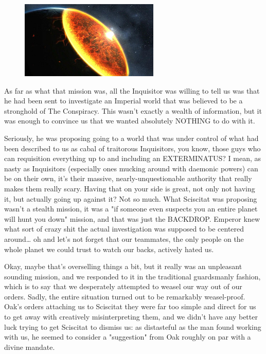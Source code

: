 \begin{figure}
	\begin{center}
		\includegraphics[width=\figwidth]{pics/17/16.png}
	\end{center}
\end{figure}
As far as what that mission was, all the Inquisitor was willing to tell us was that he had been sent to investigate an Imperial world that was believed to be a stronghold of The Conspiracy. 
This wasn't exactly a wealth of information, but it was enough to convince us that we wanted absolutely NOTHING to do with it. 


Seriously, he was proposing going to a world that was under control of what had been described to us as cabal of traitorous Inquisitors, you know, those guys who can requisition everything up to and including an EXTERMINATUS? 
I mean, as nasty as Inquisitors (especially ones mucking around with daemonic powers) can be on their own, it's their massive, nearly-unquestionable authority that really makes them really scary. 
Having that on your side is great, not only not having it, but actually going up against it? 
Not so much. 
What Sciscitat was proposing wasn't a stealth mission, it was a "if someone even suspects you an entire planet will hunt you down" mission, and that was just the BACKDROP. 
Emperor knew what sort of crazy shit the actual investigation was supposed to be centered around… oh and let's not forget that our teammates, the only people on the whole planet we could trust to watch our backs, actively hated us.

Okay, maybe that's overselling things a bit, but it really was an unpleasant sounding mission, and we responded to it in the traditional guardsmanly fashion, which is to say that we desperately attempted to weasel our way out of our orders. 
Sadly, the entire situation turned out to be remarkably weasel-proof. 
Oak's orders attaching us to Sciscitat they were far too simple and direct for us to get away with creatively misinterpreting them, and we didn't have any better luck trying to get Sciscitat to dismiss us: 
as distasteful as the man found working with us, he seemed to consider a "suggestion" from Oak roughly on par with a divine mandate. 


